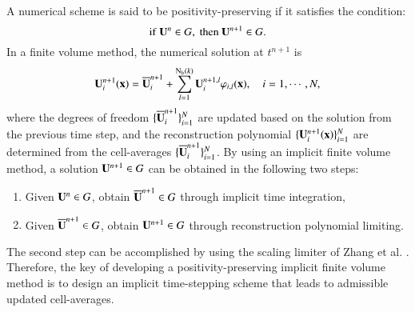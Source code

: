 A numerical scheme is said to be positivity-preserving if it satisfies the condition:
\begin{equation}
     \mathrm{if} \ \mathbf{U}^{n} \in G, \ \mathrm{then} \ \mathbf{U}^{n+1} \in G.
\end{equation}
In a finite volume method, the numerical solution at $t^{n+1}$ is
\begin{equation}
    \mathbf{U}^{n+1}_i (\mathbf{x})= \overline{\mathbf{U}}^{n+1}_i + \sum_{l=1}^{\mathrm{N_b}(k)} \mathbf{U}_i^{n+1,l} \varphi_{i,l}(\mathbf{x}), \quad i=1, \cdots,N,
\end{equation}
where the degrees of freedom $\{\overline{\mathbf{U}}^{n+1}_i\}_{i=1}^{N}$ are updated based on the solution from the previous time step, and the reconstruction polynomial $\{\mathbf{U}^{n+1}_i (\mathbf{x})\}_{i=1}^N$ are determined from the cell-averages $\{\overline{\mathbf{U}}^{n+1}_i\}_{i=1}^N$.
By using an implicit finite volume method, a solution $\mathbf{U}^{n+1} \in G$ can be obtained in the following two steps:
\begin{enumerate}[label=(\arabic*)]
    \item Given $\mathbf{U}^n \in G$, obtain $\overline{\mathbf{U}}^{n+1} \in G$ through implicit time integration,
    \item Given $\overline{\mathbf{U}}^{n+1} \in G$, obtain $\mathbf{U}^{n+1} \in G$ through reconstruction polynomial limiting.
\end{enumerate}
The second step can be accomplished by using the scaling limiter of Zhang et al. \cite{zhang2010positivity}. Therefore, the key of developing a positivity-preserving implicit finite volume method is to design an implicit time-stepping scheme that leads to admissible updated cell-averages.

